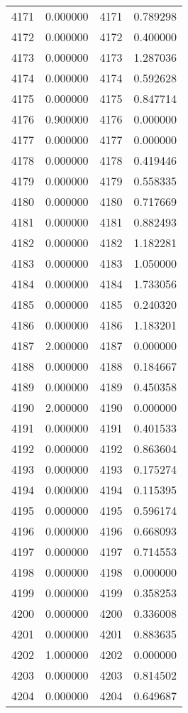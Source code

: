 \documentclass[12pt]{article}
\begin{document}
\begin{longtable}{@{}cccc@{}}
4171 & 0.000000 & 4171 & 0.789298 \\
4172 & 0.000000 & 4172 & 0.400000 \\
4173 & 0.000000 & 4173 & 1.287036 \\
4174 & 0.000000 & 4174 & 0.592628 \\
4175 & 0.000000 & 4175 & 0.847714 \\
4176 & 0.900000 & 4176 & 0.000000 \\
4177 & 0.000000 & 4177 & 0.000000 \\
4178 & 0.000000 & 4178 & 0.419446 \\
4179 & 0.000000 & 4179 & 0.558335 \\
4180 & 0.000000 & 4180 & 0.717669 \\
4181 & 0.000000 & 4181 & 0.882493 \\
4182 & 0.000000 & 4182 & 1.182281 \\
4183 & 0.000000 & 4183 & 1.050000 \\
4184 & 0.000000 & 4184 & 1.733056 \\
4185 & 0.000000 & 4185 & 0.240320 \\
4186 & 0.000000 & 4186 & 1.183201 \\
4187 & 2.000000 & 4187 & 0.000000 \\
4188 & 0.000000 & 4188 & 0.184667 \\
4189 & 0.000000 & 4189 & 0.450358 \\
4190 & 2.000000 & 4190 & 0.000000 \\
4191 & 0.000000 & 4191 & 0.401533 \\
4192 & 0.000000 & 4192 & 0.863604 \\
4193 & 0.000000 & 4193 & 0.175274 \\
4194 & 0.000000 & 4194 & 0.115395 \\
4195 & 0.000000 & 4195 & 0.596174 \\
4196 & 0.000000 & 4196 & 0.668093 \\
4197 & 0.000000 & 4197 & 0.714553 \\
4198 & 0.000000 & 4198 & 0.000000 \\
4199 & 0.000000 & 4199 & 0.358253 \\
4200 & 0.000000 & 4200 & 0.336008 \\
4201 & 0.000000 & 4201 & 0.883635 \\
4202 & 1.000000 & 4202 & 0.000000 \\
4203 & 0.000000 & 4203 & 0.814502 \\
4204 & 0.000000 & 4204 & 0.649687 \\

\end{longtable}
\end{document}
